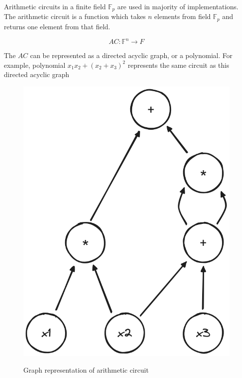 \documentclass[conference,comsoc,10pt]{IEEEtran}
\begin{document}
        Arithmetic circuits in a finite field $\mathbb{F}_p$ are used in majority
        of implementations. The arithmetic circuit is a function which takes
        $n$ elements from field $\mathbb{F}_p$ and returns one element from that field.

        \[AC: \mathbb{F}^n \rightarrow F \]

        The $AC$ can be represented as a directed acyclic graph, or a polynomial. For
        example, polynomial $x_1x_2 + (x_2 + x_3)^2$ represents the same circuit as this
        directed acyclic graph

        \begin{figure}[h]
            \centering
            \includegraphics[scale=0.3]{../bachelor/assets/images/dag_example.png}
            \caption{Graph representation of arithmetic circuit}
            \label{fig:dag_example}
            \cite{youtuMOOCLecture3}
            \vspace{0.5cm}
        \end{figure}
\end{document}
